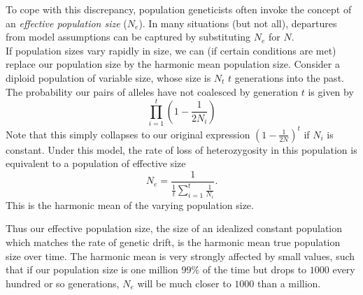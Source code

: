 To cope with this discrepancy, population geneticists often invoke the concept of
an \emph{effective population size} ($N_e$). In many situations (but not all), departures from model assumptions can be captured by substituting $N_e$ for $N$.
\\


If population sizes vary rapidly in size, we can (if certain conditions are met) replace our population size by the harmonic mean population size.
Consider a diploid population of variable size, whose size is $N_t$ $t$ generations into the
past. The probability our pairs of alleles have not coalesced by generation $t$ is
given by
\begin{equation}
\prod_{i=1}^{t} \left(1-\frac{1}{2N_i} \right) \label{eqn:var_pop_coal}
\end{equation}
Note that this simply collapses to our original expression
$\left(1-\frac{1}{2N } \right)^t $ if $N_i$ is constant. Under this model, the rate of loss of heterozygosity in this population is equivalent to
a population of effective size
\begin{equation}
N_e =\frac{1}{\frac{1}{t} \sum_{i=1}^{t} \frac{1}{N_i} }. \label{eq:Ne_harmonic}
\end{equation}
This is the harmonic mean of the varying population size. 


Thus our effective population size, the size of an idealized constant
population which matches the rate of genetic drift, is the harmonic
mean true population size over time. The harmonic mean is very
strongly affected by small values, such that if our population size is
one million $99\%$ of the time but drops to $1000$ every hundred or
so generations, $N_e$ will be much closer to $1000$ than a
million. \\


